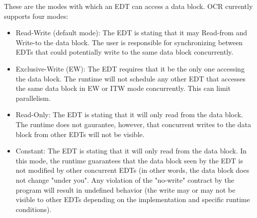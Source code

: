 These are the modes with which an EDT can access a data block. OCR currently supports four
modes:
\begin{itemize}
\item {}  Read-Write (default mode): The EDT is stating that it may Read-from and Write-to the
data block.   The user is responsible for synchronizing between EDTs that could potentially write to
the same data block concurrently.
\item {}  Exclusive-Write (EW): The EDT requires that it be the only one accessing the data block. The
runtime will not schedule any other EDT that accesses the same data block in EW or ITW mode
concurrently. This can limit parallelism.
\item {}   Read-Only: The EDT is stating that it will only read from the data block.
The runtime does not gaurantee, however, that concurrent writes to the data block from other
EDTs will not be visible.
\item {}  Constant: The EDT is stating that it will only read from the data block. In this mode, the
runtime guarantees that the data block seen by the EDT is not modified by other concurrent
EDTs (in other words, the data block does not change "under you". Any violation of the
"no-write" contract by the program will result in undefined behavior (the write may or may not
be visible to other EDTs depending on the implementation and specific runtime conditions). \\
\end{itemize}

